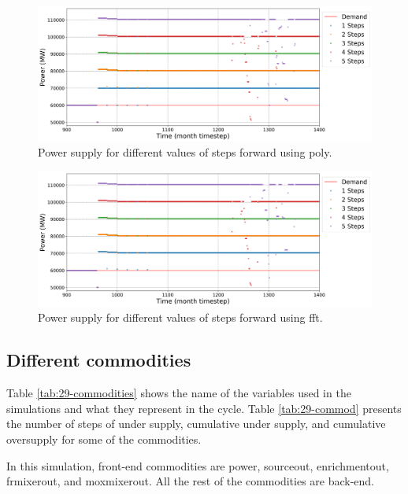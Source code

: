 \documentclass[11pt]{article}
\begin{document}
\begin{figure}[H]
	\centering
	\includegraphics[width=\textwidth]{29-figures/29-power-buffer0-poly-steps.png} 
	\hfill
	\caption{Power supply for different values of steps forward using poly.}
	\label{fig:29-ste-poly}
\end{figure}

\begin{figure}[H]
	\centering
	\includegraphics[width=\textwidth]{29-figures/29-power-buffer0-fft-steps.png} 
	\hfill
	\caption{Power supply for different values of steps forward using fft.}
	\label{fig:29-ste-fft}
\end{figure}

\subsection{Different commodities}

Table \ref{tab:29-commodities} shows the name of the variables used in the simulations and what they represent in the cycle. Table \ref{tab:29-commod} presents the number of steps of under supply, cumulative under supply, and cumulative oversupply for some of the commodities.

In this simulation, front-end commodities are power, sourceout, enrichmentout, frmixerout, and moxmixerout. All the rest of the commodities are back-end.
\end{document}
